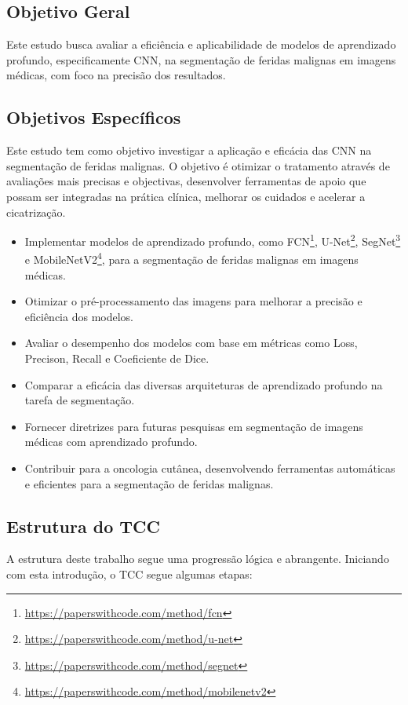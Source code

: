 \subsection{Objetivo Geral}
Este estudo busca avaliar a eficiência e aplicabilidade de modelos de aprendizado profundo, especificamente \ac{CNN}, na segmentação de feridas malignas em imagens médicas, com foco na precisão dos resultados.

\subsection{Objetivos Específicos}
Este estudo tem como objetivo investigar a aplicação e eficácia das \ac{CNN} na segmentação de feridas malignas. O objetivo é otimizar o tratamento através de avaliações mais precisas e objectivas, desenvolver ferramentas de apoio que possam ser integradas na prática clínica, melhorar os cuidados e acelerar a cicatrização.

\begin{itemize}
  \item Implementar modelos de aprendizado profundo, como \ac{FCN}\footnote{\url{https://paperswithcode.com/method/fcn}}, \ac{U-Net}\footnote{\url{https://paperswithcode.com/method/u-net}}, \ac{SegNet}\footnote{\url{https://paperswithcode.com/method/segnet}} e \ac{MobileNetV2}\footnote{\url{https://paperswithcode.com/method/mobilenetv2}}, para a segmentação de feridas malignas em imagens médicas.
  \item Otimizar o pré-processamento das imagens para melhorar a precisão e eficiência dos modelos.
  \item Avaliar o desempenho dos modelos com base em métricas como Loss, Precison, Recall e Coeficiente de Dice.
  \item Comparar a eficácia das diversas arquiteturas de aprendizado profundo na tarefa de segmentação.
  \item Fornecer diretrizes para futuras pesquisas em segmentação de imagens médicas com aprendizado profundo.
  \item Contribuir para a oncologia cutânea, desenvolvendo ferramentas automáticas e eficientes para a segmentação de feridas malignas.
\end{itemize}

\subsection{Estrutura do TCC}

A estrutura deste trabalho segue uma progressão lógica e abrangente. Iniciando com esta introdução, o TCC segue algumas etapas:

